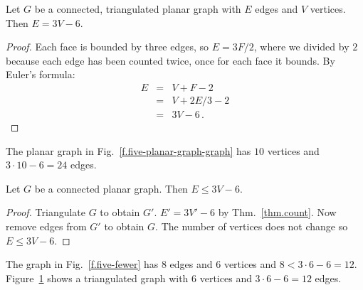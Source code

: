 \begin{theorem}
Let $G$ be a connected, triangulated planar graph with $E$ edges and $V$ vertices. Then $E= 3V-6$.
\end{theorem}
\begin{proof}
Each face is bounded by three edges, so $E=3F/2$, where we divided by $2$ because each edge has been counted twice, once for each face it bounds. By Euler's formula:
\begin{eqnarray*}
E&=&V+F-2\\
&=&V+2E/3-2\\
&=&3V-6\,.
\end{eqnarray*}
\end{proof}

\begin{example}
The planar graph in Fig.~\ref{f.five-planar-graph-graph} has $10$ vertices and $3\cdot 10-6=24$ edges.
\end{example}

\begin{theorem}\label{thm.count}
Let $G$ be a connected planar graph. Then $E\leq 3V-6$.
\end{theorem}

\begin{proof}
Triangulate $G$ to obtain $G'$. $E'= 3V'-6$ by Thm.~\ref{thm.count}. Now remove edges from $G'$ to obtain $G$. The number of vertices does not change so  $E\leq 3V-6$.
\end{proof}

\begin{example}
The graph in Fig.~\ref{f.five-fewer} has $8$ edges and $6$ vertices and $8< 3\cdot 6 - 6= 12$.
Figure~\ref{f.five-upper-limit} shows a triangulated graph with $6$ vertices and $3\cdot 6 - 6= 12$ edges.
\end{example}

\begin{figure}[t]
\subfigures
{}
\hfill
{}
\label{f.five-fewer}
\label{f.five-upper-limit}
\end{figure}

